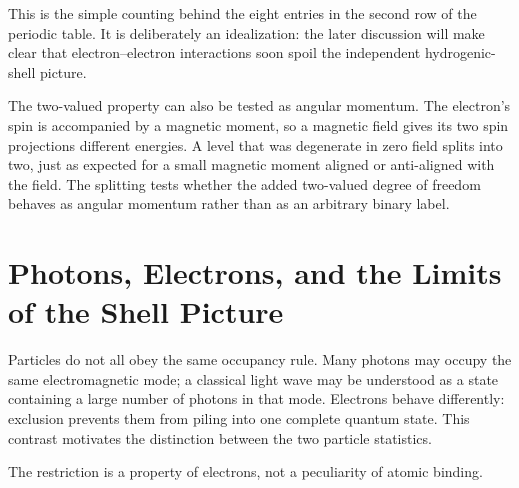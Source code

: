This is the simple counting behind the eight entries in the second row of the periodic table. It is deliberately an idealization: the later discussion will make clear that electron--electron interactions soon spoil the independent hydrogenic-shell picture.

The two-valued property can also be tested as angular momentum. The electron's spin is accompanied by a magnetic moment, so a magnetic field gives its two spin projections different energies. A level that was degenerate in zero field splits into two, just as expected for a small magnetic moment aligned or anti-aligned with the field. The splitting tests whether the added two-valued degree of freedom behaves as angular momentum rather than as an arbitrary binary label.

\section{Photons, Electrons, and the Limits of the Shell Picture}

Particles do not all obey the same occupancy rule. Many photons may occupy the same electromagnetic mode; a classical light wave may be understood as a state containing a large number of photons in that mode. Electrons behave differently: exclusion prevents them from piling into one complete quantum state. This contrast motivates the distinction between the two particle statistics.

\begin{classroomqa}
\end{classroomqa}

The restriction is a property of electrons, not a peculiarity of atomic binding.

\begin{classroomqa}
\end{classroomqa}

